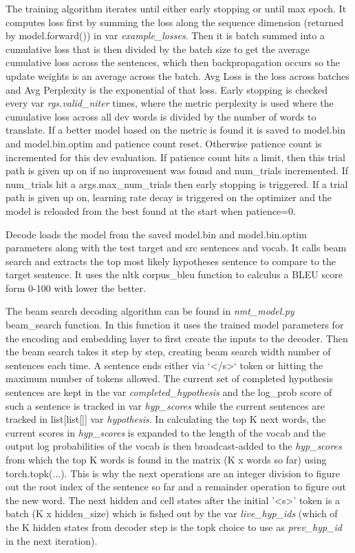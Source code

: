 \documentclass[11pt]{article}
\begin{document}
\noindent The training algorithm iterates until either early stopping or until max epoch. It computes loss first by summing the loss along the
sequence dimension (returned by model.forward()) in var \textit{example_losses}. Then it is batch summed into a cumulative loss that is then
divided by the batch size to get the average cumulative loss across the sentences, which then backpropagation occurs
so the update weights is an average across the batch. Avg Loss is the loss across batches and Avg Perplexity is the exponential of that loss. 
Early stopping is checked every var \textit{rgs.valid\_niter} times, where the metric perplexity is used where the cumulative loss across all
dev words is divided by the number of words to translate. If a better model based on the metric is found it is saved to model.bin and model.bin.optim
and patience count reset. Otherwise patience count is incremented for this dev evaluation. If patience count hits a limit, then this trial path is given up
on if no improvement was found and num_trials incremented. If num_trials hit a args.max\_num\_trials then early stopping is triggered. If a
trial path is given up on, learning rate decay is triggered on the optimizer and the model is reloaded from the best found at the start when patience=0.

\bigskip

\noindent Decode loads the model from the saved model.bin and model.bin.optim parameters along with the test target and src sentences and
vocab. It calls beam search and extracts the top most likely hypotheses sentence to compare to the target sentence. It uses the nltk corpus_bleu
function to calculus a BLEU score form 0-100 with lower the better. 

\bigskip

\noindent The beam search decoding algorithm can be found in \textit{nmt\_model.py} beam_search function. In this function it uses the trained
model parameters for the encoding and embedding layer to first create the inputs to the decoder. Then the beam search takes it step by step,
creating beam search width number of sentences each time. A sentence ends either via `</s>` token or hitting the maximum number of tokens
allowed. The current set of completed hypothesis sentences are kept in the var \textit{completed\_hypothesis} and the log\_prob score of such a
sentence is tracked in var \textit{hyp_scores} while the current sentences are tracked in list[list[]] var \textit{hypothesis}. In calculating the top K
next words, the current scores in \textit{hyp\_scores} is expanded to the length of the vocab and the output log probabilities of the vocab is then
broadcast-added to the \textit{hyp\_scores} from which the top K words is found in the matrix (K x words so far) using torch.topk(...). This is why
the next operations are an integer division to figure out the root index of the sentence so far and a remainder operation to figure out the new word.
The next hidden and cell states after the initial '<s>' token is a batch (K x hidden\_size) which is fished out by the var \textit{live\_hyp\_ids} (which
of the K hidden states from decoder step is the topk choice to use as \textit{prev\_hyp\_id} in the next iteration). 
\end{document}
